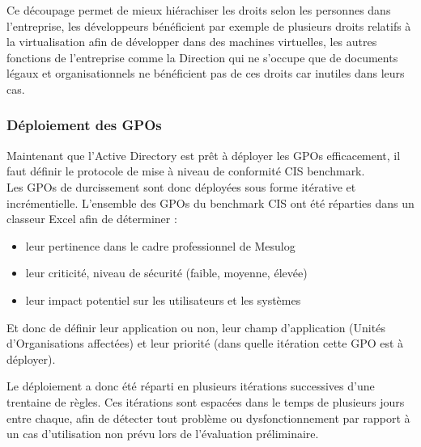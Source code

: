 \documentclass[a4paper, 11pt]{article}
\begin{document}
Ce découpage permet de mieux hiérachiser les droits selon les personnes dans l'entreprise, les développeurs bénéficient par exemple de plusieurs droits relatifs à la virtualisation afin
de développer dans des machines virtuelles, les autres fonctions de l'entreprise comme la Direction qui ne s'occupe que de documents légaux et organisationnels ne bénéficient pas de ces droits car inutiles dans leurs cas.
\newpage

\subsubsection{Déploiement des GPOs}
Maintenant que l'Active Directory est prêt à déployer les GPOs efficacement, il faut définir le protocole de mise à niveau de conformité CIS benchmark.\\
Les GPOs de durcissement sont donc déployées sous forme itérative et incrémentielle. L'ensemble des GPOs
du benchmark CIS ont été réparties dans un classeur Excel afin de déterminer :
\par\bigskip

\begin{itemize}
  \item[$\bullet$] leur pertinence dans le cadre professionnel de Mesulog
  \item[$\bullet$] leur criticité, niveau de sécurité (faible, moyenne, élevée)
  \item[$\bullet$] leur impact potentiel sur les utilisateurs et les systèmes
\end{itemize}
Et donc de définir leur application ou non, leur champ d'application (Unités d'Organisations affectées) et leur priorité (dans quelle itération cette GPO est à déployer).
\par\bigskip
Le déploiement a donc été réparti en plusieurs itérations successives d'une trentaine de règles. Ces itérations sont espacées dans le temps de plusieurs jours entre chaque, afin de détecter tout problème ou dysfonctionnement par rapport à un cas d'utilisation non prévu lors de l'évaluation préliminaire.
\par\bigskip
\end{document}
